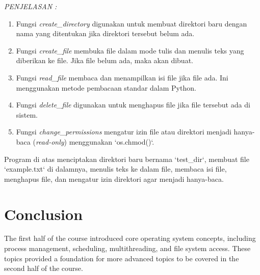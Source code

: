 \documentclass[12pt]{article}
\begin{document}
\textit{PENJELASAN :}
\begin{enumerate}
    \item Fungsi \textit{create\_directory} digunakan untuk membuat direktori baru dengan nama yang ditentukan jika direktori tersebut belum ada.
    \item Fungsi \textit{create\_file} membuka file dalam mode tulis dan menulis teks yang diberikan ke file. Jika file belum ada, maka akan dibuat.
    \item Fungsi \textit{read\_file} membaca dan menampilkan isi file jika file ada. Ini menggunakan metode pembacaan standar dalam Python.
    \item Fungsi \textit{delete\_file} digunakan untuk menghapus file jika file tersebut ada di sistem.
    \item Fungsi \textit{change\_permissions} mengatur izin file atau direktori menjadi hanya-baca (\textit{read-only}) menggunakan `os.chmod()`.

\end{enumerate}
    Program di atas menciptakan direktori baru bernama `test\_dir`, membuat file `example.txt` di dalamnya, menulis teks ke dalam file, membaca isi file, menghapus file, dan mengatur izin direktori agar menjadi hanya-baca.



\section{Conclusion}
The first half of the course introduced core operating system concepts, including process management, scheduling, multithreading, and file system access. These topics provided a foundation for more advanced topics to be covered in the second half of the course.
\end{document}

